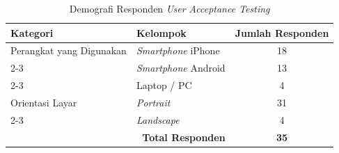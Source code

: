 \begin{table}[H]
\centering
\caption{Demografi Responden \textit{User Acceptance Testing}}
\label{tab:uat-demografi}
\begin{tabular}{|l|l|c|}
\hline
\textbf{Kategori} & \textbf{Kelompok} & \textbf{Jumlah Responden} \\ \hline
Perangkat yang Digunakan & \textit{Smartphone} iPhone & 18 \\ \cline{2-3}
                         & \textit{Smartphone} Android & 13 \\ \cline{2-3}
                         & Laptop / PC & 4 \\ \hline
Orientasi Layar & \textit{Portrait} & 31 \\ \cline{2-3}
                & \textit{Landscape} & 4 \\ \hline
\multicolumn{2}{|r|}{\textbf{Total Responden}} & \textbf{35} \\ \hline
\end{tabular}
\end{table}
